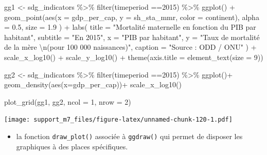 \documentclass[
]{book}
\newenvironment{Shaded}{\begin{snugshade}}{\end{snugshade}}
\newcommand{\AttributeTok}[1]{\textcolor[rgb]{0.77,0.63,0.00}{#1}}
\newcommand{\DecValTok}[1]{\textcolor[rgb]{0.00,0.00,0.81}{#1}}
\newcommand{\FloatTok}[1]{\textcolor[rgb]{0.00,0.00,0.81}{#1}}
\newcommand{\FunctionTok}[1]{\textcolor[rgb]{0.00,0.00,0.00}{#1}}
\newcommand{\NormalTok}[1]{#1}
\newcommand{\OtherTok}[1]{\textcolor[rgb]{0.56,0.35,0.01}{#1}}
\newcommand{\SpecialCharTok}[1]{\textcolor[rgb]{0.00,0.00,0.00}{#1}}
\newcommand{\StringTok}[1]{\textcolor[rgb]{0.31,0.60,0.02}{#1}}
\providecommand{\tightlist}{%
  \setlength{\itemsep}{0pt}\setlength{\parskip}{0pt}}
\begin{document}
\begin{Shaded}
\begin{Highlighting}[]
\NormalTok{gg1 }\OtherTok{\textless{}{-}}\NormalTok{ sdg\_indicators }\SpecialCharTok{\%\textgreater{}\%} 
  \FunctionTok{filter}\NormalTok{(timeperiod }\SpecialCharTok{==}\DecValTok{2015}\NormalTok{) }\SpecialCharTok{\%\textgreater{}\%} 
  \FunctionTok{ggplot}\NormalTok{() }\SpecialCharTok{+}
  \FunctionTok{geom\_point}\NormalTok{(}\FunctionTok{aes}\NormalTok{(}\AttributeTok{x =}\NormalTok{ gdp\_per\_cap, }
                 \AttributeTok{y =}\NormalTok{ sh\_sta\_mmr,}
                 \AttributeTok{color =}\NormalTok{ continent),}
    \AttributeTok{alpha =} \FloatTok{0.5}\NormalTok{, }
    \AttributeTok{size =} \FloatTok{1.9}
\NormalTok{  ) }\SpecialCharTok{+}
  \FunctionTok{labs}\NormalTok{(}
    \AttributeTok{title =} \StringTok{"Mortalité maternelle en fonction du PIB par habitant"}\NormalTok{,}
    \AttributeTok{subtitle =} \StringTok{"En 2015"}\NormalTok{,}
    \AttributeTok{x =} \StringTok{"PIB par habitant"}\NormalTok{,}
    \AttributeTok{y =} \StringTok{"Taux de mortalité de la mère }\SpecialCharTok{\textbackslash{}n}\StringTok{(pour 100 000 naissances)"}\NormalTok{,}
    \AttributeTok{caption =} \StringTok{"Source : ODD / ONU"}
\NormalTok{  ) }\SpecialCharTok{+}
  \FunctionTok{scale\_x\_log10}\NormalTok{() }\SpecialCharTok{+}
  \FunctionTok{scale\_y\_log10}\NormalTok{() }\SpecialCharTok{+}
  \FunctionTok{theme}\NormalTok{(}\AttributeTok{axis.title =} \FunctionTok{element\_text}\NormalTok{(}\AttributeTok{size =} \DecValTok{9}\NormalTok{))}

\NormalTok{  gg2 }\OtherTok{\textless{}{-}}\NormalTok{ sdg\_indicators }\SpecialCharTok{\%\textgreater{}\%} 
    \FunctionTok{filter}\NormalTok{(timeperiod }\SpecialCharTok{==}\DecValTok{2015}\NormalTok{) }\SpecialCharTok{\%\textgreater{}\%} 
    \FunctionTok{ggplot}\NormalTok{()}\SpecialCharTok{+}
    \FunctionTok{geom\_density}\NormalTok{(}\FunctionTok{aes}\NormalTok{(}\AttributeTok{x=}\NormalTok{gdp\_per\_cap))}\SpecialCharTok{+}
    \FunctionTok{scale\_x\_log10}\NormalTok{()}

\FunctionTok{plot\_grid}\NormalTok{(gg1, gg2, }\AttributeTok{ncol =} \DecValTok{1}\NormalTok{, }\AttributeTok{nrow =} \DecValTok{2}\NormalTok{)}
\end{Highlighting}
\end{Shaded}

\texttt{[image: support\_m7\_files/figure-latex/unnamed-chunk-120-1.pdf]}

\begin{itemize}
\tightlist
\item
  la fonction \texttt{draw\_plot()} associée à \texttt{ggdraw()} qui permet de disposer les graphiques à des places spécifiques.
\end{itemize}
\end{document}
